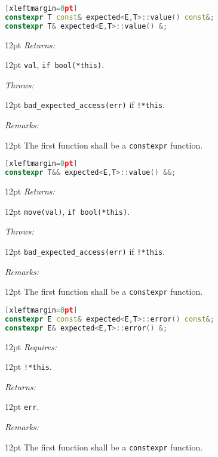 \documentclass[a4paper,10pt]{article}
\newcommand{\cpp}[1]{\lstinline{#1}}
\newcommand{\wordingItem}[1]{\noindent\textit{#1:}}
\newenvironment{wordingTextItem}[1]{\wordingItem{#1}\vspace{2pt}\noindent\begin{adjustwidth}{12pt}{}}{\vspace{2pt}\end{adjustwidth}}
\newenvironment{wordingPara}{\begin{adjustwidth}{12pt}{}}{\end{adjustwidth}}
\begin{document}
\begin{lstlisting}[language=C++][xleftmargin=0pt]
constexpr T const& expected<E,T>::value() const&;
constexpr T& expected<E,T>::value() &;
\end{lstlisting}
\begin{wordingPara}
\begin{wordingTextItem}{Returns}
\cpp{val}, \cpp{if bool(*this)}.
\end{wordingTextItem}
\begin{wordingTextItem}{Throws}
\cpp{bad_expected_access(err)} if \cpp{!*this}.
\end{wordingTextItem}
\begin{wordingTextItem}{Remarks}
The first function shall be a \cpp{constexpr} function.
\end{wordingTextItem}
\end{wordingPara}

\begin{lstlisting}[language=C++][xleftmargin=0pt]
constexpr T&& expected<E,T>::value() &&;
\end{lstlisting}
\begin{wordingPara}
\begin{wordingTextItem}{Returns}
\cpp{move(val)}, \cpp{if bool(*this)}.
\end{wordingTextItem}
\begin{wordingTextItem}{Throws}
\cpp{bad_expected_access(err)} if \cpp{!*this}.
\end{wordingTextItem}
\begin{wordingTextItem}{Remarks}
The first function shall be a \cpp{constexpr} function.
\end{wordingTextItem}
\end{wordingPara}

\begin{lstlisting}[language=C++][xleftmargin=0pt]
constexpr E const& expected<E,T>::error() const&;
constexpr E& expected<E,T>::error() &; 
\end{lstlisting}
\begin{wordingPara}
\begin{wordingTextItem}{Requires}
\cpp{!*this}.
\end{wordingTextItem}
\begin{wordingTextItem}{Returns}
\cpp{err}.
\end{wordingTextItem}
\begin{wordingTextItem}{Remarks}
The first function shall be a \cpp{constexpr} function.
\end{wordingTextItem}
\end{wordingPara}
\end{document}
